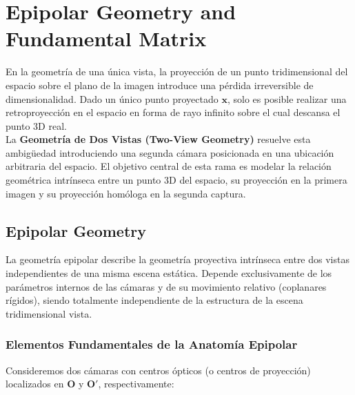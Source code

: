 \chapter{Epipolar Geometry and Fundamental Matrix}

\noindent
En la geometría de una única vista, la proyección de un punto tridimensional del espacio sobre el plano de la imagen introduce una pérdida irreversible de dimensionalidad. Dado un único punto proyectado $\mathbf{x}$, solo es posible realizar una retroproyección en el espacio en forma de rayo infinito sobre el cual descansa el punto 3D real. \\

\noindent
La \textbf{Geometría de Dos Vistas (Two-View Geometry)} resuelve esta ambigüedad introduciendo una segunda cámara posicionada en una ubicación arbitraria del espacio. El objetivo central de esta rama es modelar la relación geométrica intrínseca entre un punto 3D del espacio, su proyección en la primera imagen y su proyección homóloga en la segunda captura.

\section{Epipolar Geometry}
La geometría epipolar describe la geometría proyectiva intrínseca entre dos vistas independientes de una misma escena estática. Depende exclusivamente de los parámetros internos de las cámaras y de su movimiento relativo (coplanares rígidos), siendo totalmente independiente de la estructura de la escena tridimensional vista.

\subsection{Elementos Fundamentales de la Anatomía Epipolar}
\noindent
Consideremos dos cámaras con centros ópticos (o centros de proyección) localizados en $\mathbf{O}$ y $\mathbf{O}'$, respectivamente:

